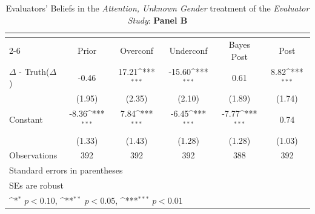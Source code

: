 \begin{table}[htbp]\centering
\def\sym#1{\ifmmode^{#1}\else\(^{#1}\)\fi}
\caption{Evaluators' Beliefs in the \textit{Attention, Unknown Gender} treatment of the \textit{Evaluator Study}: \textbf{Panel B}}
\begin{tabular}{l*{5}{c}}
\hline\hline
                &\multicolumn{5}{c}{}                                                                          \\\cmidrule(lr){2-6}
                &\multicolumn{1}{c}{Prior}&\multicolumn{1}{c}{Overconf}&\multicolumn{1}{c}{Underconf}&\multicolumn{1}{c}{Bayes Post}&\multicolumn{1}{c}{Post}\\
\hline
$\Delta$ - Truth($\Delta$)&    -0.46         &    17.21\sym{***}&   -15.60\sym{***}&     0.61         &     8.82\sym{***}\\
                &   (1.95)         &   (2.35)         &   (2.10)         &   (1.89)         &   (1.74)         \\
Constant        &    -8.36\sym{***}&     7.84\sym{***}&    -6.45\sym{***}&    -7.77\sym{***}&     0.74         \\
                &   (1.33)         &   (1.43)         &   (1.28)         &   (1.28)         &   (1.03)         \\
\hline
Observations    &      392         &      392         &      392         &      388         &      392         \\
\hline\hline
\multicolumn{6}{l}{\footnotesize Standard errors in parentheses}\\
\multicolumn{6}{l}{\footnotesize SEs are robust}\\
\multicolumn{6}{l}{\footnotesize \sym{*} \(p<0.10\), \sym{**} \(p<0.05\), \sym{***} \(p<0.01\)}\\
\end{tabular}
\end{table}
